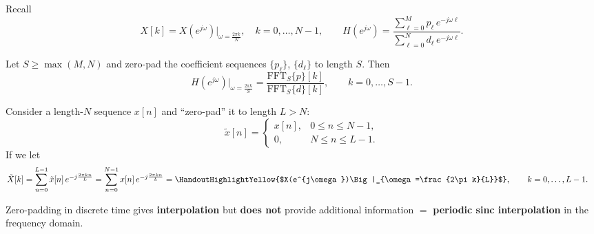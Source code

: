 \documentclass[handout_subfiles_root.tex]{subfiles}
\begin{document}
\noindent Recall
\begin{equation*}
X[k] = X(e^{j\omega})\Big|_{\omega=\frac{2\pi k}{N}}, \quad k=0,\dots,N-1,
\qquad
H(e^{j\omega}) = \frac{\displaystyle\sum_{\ell=0}^{M} p_\ell\,e^{-j\omega\ell}}{\displaystyle\sum_{\ell=0}^{N} d_\ell\,e^{-j\omega\ell}}.
\end{equation*}
\begin{factbox}[title={Evaluating $H(e^{j\omega})$ on a grid}]
Let $S\ge\max(M,N)$ and zero-pad the coefficient sequences $\{p_\ell\}$, $\{d_\ell\}$ to length $S$.\footnotemark{} Then
\begin{equation*}
H(e^{j\omega})\Big|_{\omega=\frac{2\pi k}{S}} = \frac{\mathrm{FFT}_S\{p\}[k]}{\mathrm{FFT}_S\{d\}[k]}, \qquad k=0,\dots,S-1.
\end{equation*}
\end{factbox}


\noindent Consider a length-$N$ sequence $x[n]$ and ``zero-pad'' it to length $L>N$:
\begin{equation*}
\tilde x[n] = \begin{cases} x[n], & 0\le n\le N-1, \\ 0, & N\le n\le L-1. \end{cases}
\end{equation*}
If we let
\begin{align*}
\tilde X[k] &= \sum_{n=0}^{L-1}\tilde x[n]\,e^{-j\frac{2\pi kn}{L}}
= \sum_{n=0}^{N-1} x[n]\,e^{-j\frac{2\pi kn}{L}}
= \HandoutHighlightYellow{$X(e^{j\omega})\Big|_{\omega=\frac{2\pi k}{L}}$}, \qquad k=0,\dots,L-1.
\end{align*}

\begin{factbox}[title={Property}]
Zero-padding in discrete time gives \textbf{interpolation} but \textbf{does not} provide additional information
$=$ \textbf{periodic sinc interpolation} in the frequency domain.
\end{factbox}
\end{document}
